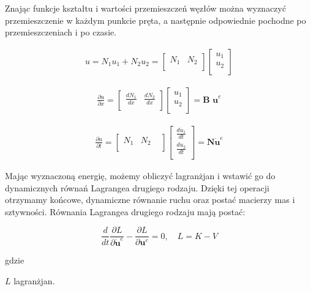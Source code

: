 Znając funkcje kształtu i wartości przemieszczeń węzłów można wyznaczyć przemieszczenie w każdym punkcie pręta, a następnie odpowiednie pochodne po przemieszczeniach i po czasie.

\begin{gather}
u = N_1 u_1 + N_2 u_2 = 
	\begin{bmatrix} 
	 	N_1 & N_2 \\
	\end{bmatrix}
	\begin{bmatrix} 
	 	u_1 \\
		u_2 \\
	\end{bmatrix}
\end{gather}

\begin{gather}
\frac{\partial u}{\partial x}= 
	\begin{bmatrix} 
	 	\frac{d N_1}{d x} & \frac{d N_2}{d x} \\
	\end{bmatrix}
	\begin{bmatrix} 
	 	u_1 \\
		u_2 \\
	\end{bmatrix} = \textbf{B u}^e
\end{gather}


\begin{gather}
\frac{\partial u}{\partial t}= 
	\begin{bmatrix} 
	 	N_1 &  N_2 & \\
	\end{bmatrix}
	\begin{bmatrix} 
	 	\frac{du_1}{dt} \\
		\frac{du_2}{dt}\\
	\end{bmatrix} = \textbf{N} \dot{\textbf{u}}^e
\end{gather}


	Mając wyznaczoną energię, możemy obliczyć lagranżjan i wstawić go do dynamicznych równań Lagrangea drugiego rodzaju. Dzięki tej operacji otrzymamy końcowe, dynamiczne równanie ruchu oraz postać macierzy mas i sztywności. Równania Lagrangea drugiego rodzaju mają postać:

\begin{equation}
\frac{d}{dt} \frac{\partial L}{\partial \dot{\textbf{u}}^e} - \frac{\partial L}{\partial \textbf{u}^e} = 0, \quad L = K - V
\end{equation}

gdzie
\begin{eqwhere}[2cm]
	\item[$L$] lagranżjan.
\end{eqwhere}

